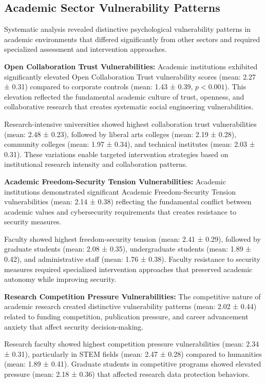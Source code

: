 \documentclass[10pt, twocolumn]{article}
\begin{document}
\subsection{Academic Sector Vulnerability Patterns}

Systematic analysis revealed distinctive psychological vulnerability patterns in academic environments that differed significantly from other sectors and required specialized assessment and intervention approaches.

\textbf{Open Collaboration Trust Vulnerabilities:} Academic institutions exhibited significantly elevated Open Collaboration Trust vulnerability scores (mean: 2.27 ± 0.31) compared to corporate controls (mean: 1.43 ± 0.39, $p < 0.001$). This elevation reflected the fundamental academic culture of trust, openness, and collaborative research that creates systematic social engineering vulnerabilities.

Research-intensive universities showed highest collaboration trust vulnerabilities (mean: 2.48 ± 0.23), followed by liberal arts colleges (mean: 2.19 ± 0.28), community colleges (mean: 1.97 ± 0.34), and technical institutes (mean: 2.03 ± 0.31). These variations enable targeted intervention strategies based on institutional research intensity and collaboration patterns.

\textbf{Academic Freedom-Security Tension Vulnerabilities:} Academic institutions demonstrated significant Academic Freedom-Security Tension vulnerabilities (mean: 2.14 ± 0.38) reflecting the fundamental conflict between academic values and cybersecurity requirements that creates resistance to security measures.

Faculty showed highest freedom-security tension (mean: 2.41 ± 0.29), followed by graduate students (mean: 2.08 ± 0.35), undergraduate students (mean: 1.89 ± 0.42), and administrative staff (mean: 1.76 ± 0.38). Faculty resistance to security measures required specialized intervention approaches that preserved academic autonomy while improving security.

\textbf{Research Competition Pressure Vulnerabilities:} The competitive nature of academic research created distinctive vulnerability patterns (mean: 2.02 ± 0.44) related to funding competition, publication pressure, and career advancement anxiety that affect security decision-making.

Research faculty showed highest competition pressure vulnerabilities (mean: 2.34 ± 0.31), particularly in STEM fields (mean: 2.47 ± 0.28) compared to humanities (mean: 1.89 ± 0.41). Graduate students in competitive programs showed elevated pressure (mean: 2.18 ± 0.36) that affected research data protection behaviors.
\end{document}
